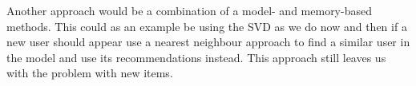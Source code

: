 Another approach would be a combination of a model- and memory-based methods. This could as an example be using the SVD as we do now and then if a new user should appear use a nearest neighbour approach to find a similar user in the model and use its recommendations instead. This approach still leaves us with the problem with new items. 




